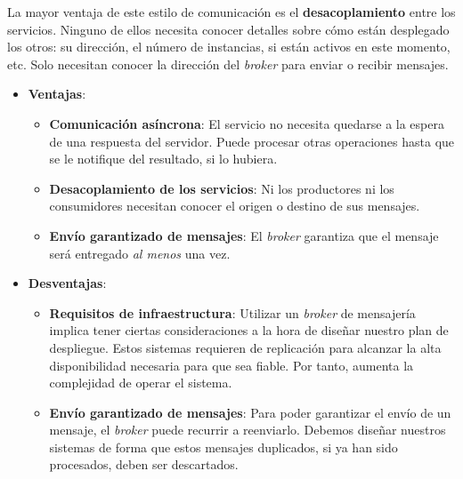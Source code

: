 \begin{itemize}
  La mayor ventaja de este estilo de comunicación es el \textbf{desacoplamiento} entre los servicios. \cite{korabUnderstandingMessageBrokers2017}
  Ninguno de ellos necesita conocer detalles sobre cómo están desplegado los otros: su dirección, el número de instancias, si están activos en este momento, etc. Solo necesitan conocer la dirección del \emph{broker} para enviar o recibir mensajes.

  \begin{itemize}
    \item \textbf{Ventajas}:

    \begin{itemize}
      \item \textbf{Comunicación asíncrona}: El servicio no necesita quedarse a la espera de una respuesta del servidor. Puede procesar otras operaciones hasta que se le notifique del resultado, si lo hubiera.

      \item \textbf{Desacoplamiento de los servicios}: Ni los productores ni los consumidores necesitan conocer el origen o destino de sus mensajes.

      \item \textbf{Envío garantizado de mensajes}: El \emph{broker} garantiza que el mensaje será entregado \emph{al menos} una vez.

    \end{itemize}

    \item \textbf{Desventajas}:

    \begin{itemize}
      \item \textbf{Requisitos de infraestructura}: Utilizar un \emph{broker} de mensajería implica tener ciertas consideraciones a la hora de diseñar nuestro plan de despliegue. Estos sistemas requieren de replicación para alcanzar la alta disponibilidad necesaria para que sea fiable. \cite{newmanBuildingMicroservicesDesigning2021} Por tanto, aumenta la complejidad de operar el sistema.

      \item \textbf{Envío garantizado de mensajes}: Para poder garantizar el envío de un mensaje, el \emph{broker} puede recurrir a reenviarlo. Debemos diseñar nuestros sistemas de forma que estos mensajes duplicados, si ya han sido procesados, deben ser descartados.
    \end{itemize}
  \end{itemize}
\end{itemize}

